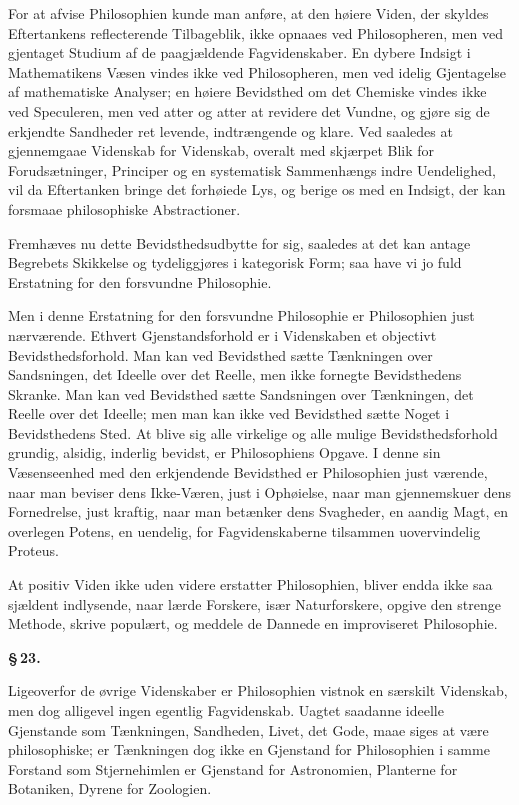 \documentclass[12pt]{book}
\newcommand{\opage}[1]{\marginnote{\footnotesize\textit{[#1]}}}
\begin{document}
For at afvise Philosophien kunde man anføre, at den høiere Viden, der skyldes Eftertankens
reflecterende Tilbageblik, ikke opnaaes ved Philosopheren, men ved gjentaget Studium af de
paagjældende Fagvidenskaber. En dybere Indsigt i Mathematikens Væsen vindes ikke ved
Philosopheren, men ved idelig Gjentagelse af mathematiske Analyser; en høiere Bevidsthed om
det Chemiske vindes ikke ved Speculeren, men ved atter og atter at revidere det Vundne, og
gjøre sig de erkjendte Sandheder ret levende, indtrængende og klare. Ved saaledes at
gjennemgaae Videnskab for Videnskab, overalt med skjærpet Blik for Forudsætninger, Principer
og en systematisk Sammenhængs indre Uendelighed, vil da Eftertanken bringe det forhøiede
Lys, og berige os med en Indsigt, der kan forsmaae philosophiske Abstractioner.

Fremhæves nu dette Bevidsthedsudbytte for sig, saaledes at det kan antage Begrebets
Skikkelse og tydeliggjøres i kategorisk Form; saa have vi jo fuld Erstatning for den
forsvundne Philosophie.

Men i denne Erstatning for den forsvundne Philosophie er Philosophien just nærværende.
Ethvert Gjenstandsforhold er i Videnskaben et objectivt Bevidsthedsforhold. Man kan ved
Bevidsthed sætte Tænkningen over Sandsningen, det
\opage{102} Ideelle over det Reelle, men ikke fornegte Bevidsthedens Skranke. Man kan ved Bevidsthed
sætte Sandsningen over Tænkningen, det Reelle over det Ideelle; men man kan ikke ved
Bevidsthed sætte Noget i Bevidsthedens Sted. At blive sig alle virkelige og alle mulige
Bevidsthedsforhold grundig, alsidig, inderlig bevidst, er Philosophiens Opgave. I denne sin
Væsenseenhed med den erkjendende Bevidsthed er Philosophien just værende, naar man beviser
dens Ikke-Væren, just i Ophøielse, naar man gjennemskuer dens Fornedrelse, just kraftig,
naar man betænker dens Svagheder, en aandig Magt, en overlegen Potens, en uendelig, for
Fagvidenskaberne tilsammen uovervindelig Proteus.

At positiv Viden ikke uden videre erstatter Philosophien, bliver endda ikke saa sjældent
indlysende, naar lærde Forskere, især Naturforskere, opgive den strenge Methode, skrive
populært, og meddele de Dannede en improviseret Philosophie.

\begin{center}{\bfseries \S\,23.}\end{center}

Ligeoverfor de øvrige Videnskaber er Philosophien vistnok en særskilt Videnskab, men dog
alligevel ingen egentlig Fagvidenskab. Uagtet saadanne ideelle Gjenstande som Tænkningen,
Sandheden, Livet, det Gode, maae siges at være philosophiske; er Tænkningen dog ikke en
Gjenstand for Philosophien i samme Forstand som Stjernehimlen er Gjenstand for Astronomien,
Planterne for Botaniken, Dyrene for Zoologien.
\end{document}
